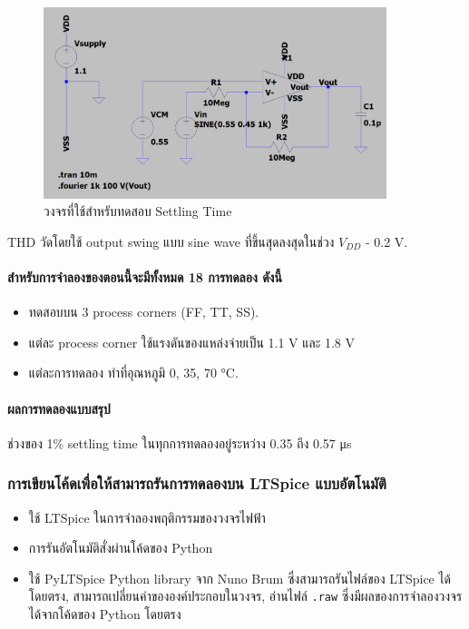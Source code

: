 \documentclass[a4paper, 11pt, oneside]{book} %
\begin{document}
\begin{figure}[h]
    \centering
    \includegraphics[width = 10cm]{measure-thd}
    \caption{วงจรที่ใช้สำหรับทดสอบ Settling Time}
    \label{measure-thd}
\end{figure}

THD วัดโดยใช้ output swing แบบ sine wave ที่ขึ้นสุดลงสุดในช่วง $V_{DD}$ - 0.2 V.

\paragraph{สำหรับการจำลองของตอนนี้จะมีทั้งหมด 18 การทดลอง ดังนี้}

\begin{itemize}
    \item ทดสอบบน 3 process corners (FF, TT, SS).
    \item แต่ละ process corner ใช้แรงดันของแหล่งจ่ายเป็น 1.1 V และ 1.8 V
    \item แต่ละการทดลอง ทำที่อุณหภูมิ 0, 35, 70 \si{\degreeCelsius}.
\end{itemize}

\paragraph{ผลการทดลองแบบสรุป}

ช่วงของ 1\% settling time ในทุกการทดลองอยู่ระหว่าง 0.35 ถึง 0.57 \si{\micro s}

\subsubsection{การเขียนโค้ดเพื่อให้สามารถรันการทดลองบน LTSpice แบบอัตโนมัติ}

\begin{itemize}
    \item ใช้ LTSpice ในการจำลองพฤติกรรมของวงจรไฟฟ้า
    \item การรันอัตโนมัติสั่งผ่านโค้ดของ Python
    \item ใช้ PyLTSpice Python library จาก Nuno Brum ซึ่งสามารถรันไฟล์ของ LTSpice ได้โดยตรง, สามารถเปลี่ยนค่าขององค์ประกอบในวงจร, อ่านไฟล์ \lstinline{.raw} ซึ่งมีผลของการจำลองวงจรได้จากโค้ดของ Python โดยตรง \cite{Brum22}
\end{itemize}
\end{document}
